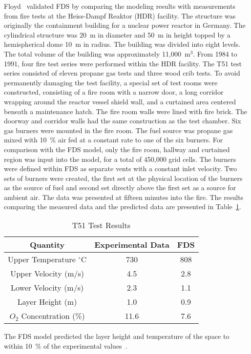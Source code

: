 Floyd~\cite{Floyd:5,Floyd:6} validated  FDS by comparing  the modeling results with  measurements from fire tests at  the Heiss-Dampf Reaktor (HDR)
facility.  The structure was originally the containment building for a nuclear power reactor  in Germany. The cylindrical structure was 20~m in
diameter and  50~m in height  topped by a  hemispherical dome 10~m  in radius.   The building  was divided  into eight  levels.  The total  volume of
the building  was approximately  11,000~m$^3$.  From 1984  to 1991, four  fire test  series were  performed within  the HDR facility.  The T51  test
series consisted of eleven  propane gas tests and three  wood crib  tests.  To avoid  permanently damaging  the test facility, a special set of  test
rooms were constructed, consisting of a fire  room with a narrow  door, a long corridor  wrapping around the reactor vessel  shield wall, and  a
curtained area centered  beneath a maintenance  hatch.   The  fire   room  walls  were  lined  with  fire brick. The doorway and corridor walls had
the same construction as the test chamber. Six gas burners were mounted in the fire room.  The fuel source was propane gas mixed with  10~\% air fed
at a constant rate to one of the  six burners.  For comparison with the  FDS model, only the fire room, hallway and curtained  region was input into
the model, for a total of 450,000 grid cells.  The burners were defined within FDS as separate vents  with a constant  inlet velocity.  Two sets  of
burners were created, the first set at the physical location of the burners as the source  of fuel and second set  directly above the first  set as a
source for  ambient air.   The data was  presented at  fifteen minutes into  the fire.   The  results  comparing the  measured  data and  the
predicted data are presented in Table~\ref{T51}.
\begin{table}
\begin{center}
\caption{T51 Test Results \cite{Floyd:5}} \label{T51} \vspace{0.1in}
\begin{tabular}{|*{3}{c|}} \hline
Quantity & Experimental Data &  FDS \\ \hline \hline Upper Temperature
$^\circ$C & 730  & 808 \\ \hline  Upper Velocity (m/s) & 4.5  & 2.8 \\
\hline Lower Velocity  (m/s) & 2.3 & 1.1 \\ \hline  Layer Height (m) & 1.0 & 0.9 \\ \hline $O_{2}$ Concentration (\%) & 11.6 & 7.6 \\ \hline
\end{tabular}
\end{center}
\end{table}
The FDS model predicted the  layer height and temperature of the space to within 10~\% of the experimental values~\cite{Floyd:5}.


